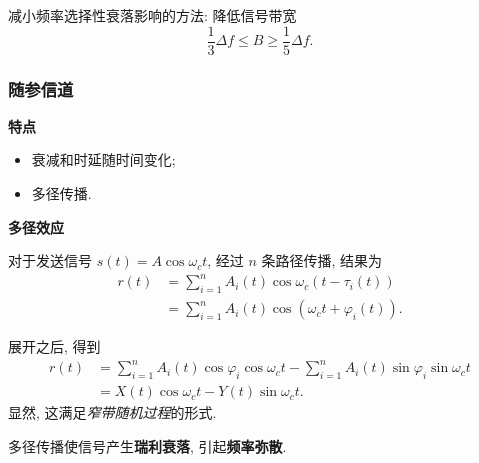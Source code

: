 减小频率选择性衰落影响的方法: 降低信号带宽
\begin{equation}
    \frac{1}{3}\Delta f\leq B\geq\frac{1}{5}\Delta f.
\end{equation}

\subsubsection{随参信道}
\textbf{特点}
\begin{itemize}
    \item 衰减和时延随时间变化;
    \item 多径传播.
\end{itemize}

\textbf{多径效应}

对于发送信号 $s(t)=A\cos\omega_ct$, 经过 $n$ 条路径传播, 结果为
\begin{equation}
    \begin{aligned}
        r(t) & =\sum_{i=1}^{n}A_i(t)\cos\omega_c(t-\tau_i(t))     \\
             & =\sum_{i=1}^{n}A_i(t)\cos(\omega_ct+\varphi_i(t)).
    \end{aligned}
\end{equation}

展开之后, 得到
\begin{equation}
    \begin{aligned}
        r(t) & =\sum_{i=1}^{n}A_i(t)\cos\varphi_i\cos\omega_ct-\sum_{i=1}^{n}A_i(t)\sin\varphi_i\sin\omega_ct \\
             & =X(t)\cos\omega_ct-Y(t)\sin\omega_ct.
    \end{aligned}
\end{equation}
显然, 这满足\textit{窄带随机过程}的形式.

多径传播使信号产生\textbf{瑞利衰落}, 引起\textbf{频率弥散}.
